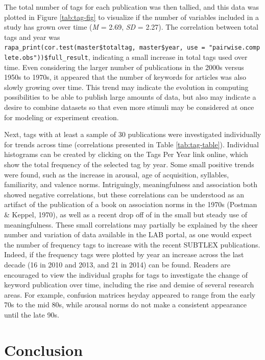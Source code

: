 \documentclass[english,man]{apa6}
\theoremstyle{definition}
\theoremstyle{definition}
\theoremstyle{definition}
\theoremstyle{remark}
\begin{document}
The total number of tags for each publication was then tallied, and this
data was plotted in Figure \ref{tab:tag-fig} to visualize if the number
of variables included in a study has grown over time (\emph{M} = 2.69,
\emph{SD} = 2.27). The correlation between total tags and year was
\texttt{rapa\_print(cor.test(master\$totaltag,\ master\$year,\ use\ =\ "pairwise.complete.obs"))\$full\_result},
indicating a small increase in total tags used over time. Even
considering the larger number of publications in the 2000s versus 1950s
to 1970s, it appeared that the number of keywords for articles was also
slowly growing over time. This trend may indicate the evolution in
computing possibilities to be able to publish large amounts of data, but
also may indicate a desire to combine datasets so that even more stimuli
may be considered at once for modeling or experiment creation.

Next, tags with at least a sample of 30 publications were investigated
individually for trends across time (correlations presented in Table
\ref{tab:tag-table}). Individual histograms can be created by clicking
on the Tags Per Year link online, which show the total frequency of the
selected tag by year. Some small positive trends were found, such as the
increase in arousal, age of acquisition, syllables, familiarity, and
valence norms. Intriguingly, meaningfulness and association both showed
negative correlations, but these correlations can be understood as an
artifact of the publication of a book on association norms in the 1970s
(Postman \& Keppel, 1970), as well as a recent drop off of in the small
but steady use of meaningfulness. These small correlations may partially
be explained by the sheer number and variation of data available in the
LAB portal, as one would expect the number of frequency tags to increase
with the recent SUBTLEX publications. Indeed, if the frequency tags were
plotted by year an increase across the last decade (16 in 2010 and 2013,
and 21 in 2014) can be found. Readers are encouraged to view the
individual graphs for tags to investigate the change of keyword
publication over time, including the rise and demise of several research
areas. For example, confusion matrices heyday appeared to range from the
early 70s to the mid 80s, while arousal norms do not make a consistent
appearance until the late 90s.

\section{Conclusion}\label{conclusion}
\end{document}
